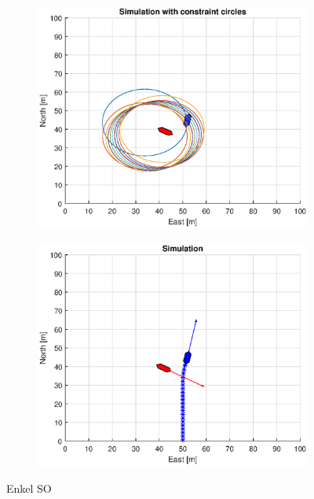 \begin{figure}[!b]
\begin{subfigure}[b]{0.499\textwidth}
    \end{subfigure}
    \hfill
    \\
    \begin{subfigure}[b]{0.49\textwidth}
        \centering
        \includegraphics[width=\textwidth]{Images/Figures/Enkel_SO/Simple0_f1_Frame3}
    \end{subfigure}
    \hfill
    \begin{subfigure}[b]{0.499\textwidth}
        \centering
        \includegraphics[width=\textwidth]{Images/Figures/Enkel_SO/Simple0_f600_Frame3}
    \end{subfigure}
    \hfill
    \caption{Enkel SO}
\end{figure}%

